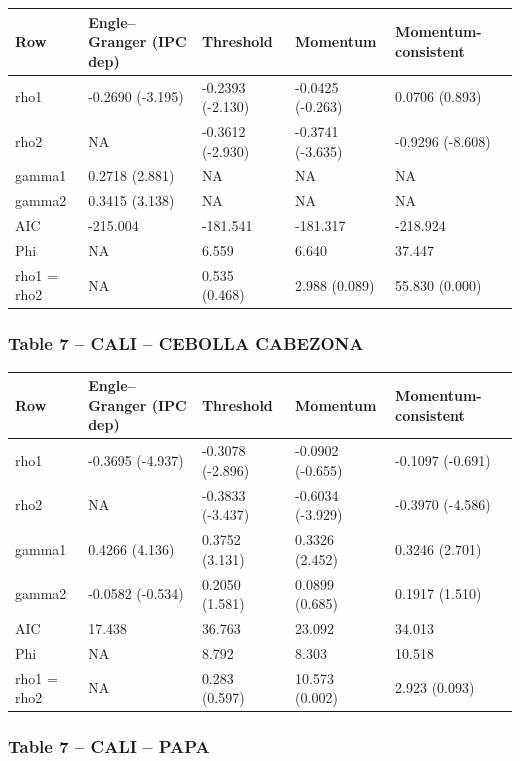 \documentclass[
  12pt,
]{article}
\begin{document}
\begin{longtable}[t]{lllll}
\toprule
Row & Engle–Granger (IPC dep) & Threshold & Momentum & Momentum-consistent\\
\midrule
rho1 & -0.2690 (-3.195) & -0.2393 (-2.130) & -0.0425 (-0.263) & 0.0706 (0.893)\\
rho2 & NA & -0.3612 (-2.930) & -0.3741 (-3.635) & -0.9296 (-8.608)\\
gamma1 & 0.2718 (2.881) & NA & NA & NA\\
gamma2 & 0.3415 (3.138) & NA & NA & NA\\
AIC & -215.004 & -181.541 & -181.317 & -218.924\\
\addlinespace
Phi & NA & 6.559 & 6.640 & 37.447\\
rho1 = rho2 & NA & 0.535 (0.468) & 2.988 (0.089) & 55.830 (0.000)\\
\bottomrule
\end{longtable}

\subsubsection{Table 7 -- CALI -- CEBOLLA
CABEZONA}\label{table-7-cali-cebolla-cabezona}

\begin{longtable}[t]{lllll}
\toprule
Row & Engle–Granger (IPC dep) & Threshold & Momentum & Momentum-consistent\\
\midrule
rho1 & -0.3695 (-4.937) & -0.3078 (-2.896) & -0.0902 (-0.655) & -0.1097 (-0.691)\\
rho2 & NA & -0.3833 (-3.437) & -0.6034 (-3.929) & -0.3970 (-4.586)\\
gamma1 & 0.4266 (4.136) & 0.3752 (3.131) & 0.3326 (2.452) & 0.3246 (2.701)\\
gamma2 & -0.0582 (-0.534) & 0.2050 (1.581) & 0.0899 (0.685) & 0.1917 (1.510)\\
AIC & 17.438 & 36.763 & 23.092 & 34.013\\
\addlinespace
Phi & NA & 8.792 & 8.303 & 10.518\\
rho1 = rho2 & NA & 0.283 (0.597) & 10.573 (0.002) & 2.923 (0.093)\\
\bottomrule
\end{longtable}

\subsubsection{Table 7 -- CALI -- PAPA}\label{table-7-cali-papa}
\end{document}

